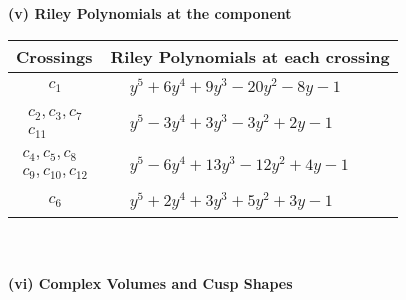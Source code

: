 \documentclass[1p]{elsarticle_modified}
\theoremstyle{definition}
\begin{document}
\newpage\renewcommand{\arraystretch}{1}
\flushleft \textbf{(v) Riley Polynomials at the component}\newline \\
\begin{tabular}{m{50pt}|m{274pt}}
Crossings & \hspace{64pt}Riley Polynomials at each crossing \\
\hline $$\begin{aligned}c_{1}\end{aligned}$$&$\begin{aligned}
&y^5+6 y^4+9 y^3-20 y^2-8 y-1
\end{aligned}$\\
\hline $$\begin{aligned}c_{2},c_{3},c_{7}\\c_{11}\end{aligned}$$&$\begin{aligned}
&y^5-3 y^4+3 y^3-3 y^2+2 y-1
\end{aligned}$\\
\hline $$\begin{aligned}c_{4},c_{5},c_{8}\\c_{9},c_{10},c_{12}\end{aligned}$$&$\begin{aligned}
&y^5-6 y^4+13 y^3-12 y^2+4 y-1
\end{aligned}$\\
\hline $$\begin{aligned}c_{6}\end{aligned}$$&$\begin{aligned}
&y^5+2 y^4+3 y^3+5 y^2+3 y-1
\end{aligned}$\\
\hline
\end{tabular}\\~\\
\newpage\flushleft \textbf{(vi) Complex Volumes and Cusp Shapes}
\end{document}
